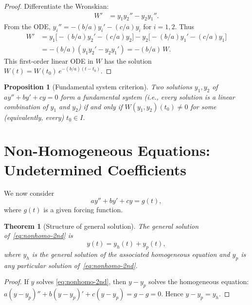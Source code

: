 \documentclass[12pt,a4paper,openany]{book}
\theoremstyle{definition}
\theoremstyle{plain}
\newtheorem{theorem}[definition]{Theorem}
\newtheorem{proposition}[definition]{Proposition}
\theoremstyle{remark}
\begin{document}
\begin{proof}
Differentiate the Wronskian:
\begin{align*}
  W' &= y_1 y_2'' - y_2 y_1''.
\end{align*}
From the ODE, $y_i'' = -(b/a)y_i' - (c/a)y_i$ for $i = 1, 2$. Thus
\begin{align*}
  W' &= y_1\bigl[-(b/a)y_2' - (c/a)y_2\bigr]
       - y_2\bigl[-(b/a)y_1' - (c/a)y_1\bigr] \\
     &= -(b/a)(y_1 y_2' - y_2 y_1') = -(b/a)\,W.
\end{align*}
This first-order linear ODE in $W$ has the solution
$W(t) = W(t_0)\,e^{-(b/a)(t-t_0)}$.
\end{proof}

\begin{proposition}[Fundamental system criterion]\label{prop:fund-system}
Two solutions $y_1, y_2$ of $ay'' + by' + cy = 0$ form a fundamental system
(i.e., every solution is a linear combination of $y_1$ and $y_2$) if and only
if $W(y_1, y_2)(t_0) \ne 0$ for some (equivalently, every) $t_0 \in I$.
\end{proposition}

\section{Non-Homogeneous Equations: Undetermined Coefficients}\label{sec:undetermined-coeff}

We now consider
\begin{equation}\label{eq:nonhomo-2nd}
  ay'' + by' + cy = g(t),
\end{equation}
where $g(t)$ is a given forcing function.

\begin{theorem}[Structure of general solution]\label{thm:general-nonhomo}
The general solution of~\eqref{eq:nonhomo-2nd} is
\[
  y(t) = y_h(t) + y_p(t),
\]
where $y_h$ is the general solution of the associated homogeneous equation
and $y_p$ is any particular solution of~\eqref{eq:nonhomo-2nd}.
\end{theorem}

\begin{proof}
If $y$ solves \eqref{eq:nonhomo-2nd}, then $y - y_p$ solves the homogeneous
equation: $a(y-y_p)'' + b(y-y_p)' + c(y-y_p) = g - g = 0$.
Hence $y - y_p = y_h$.
\end{proof}
\end{document}
